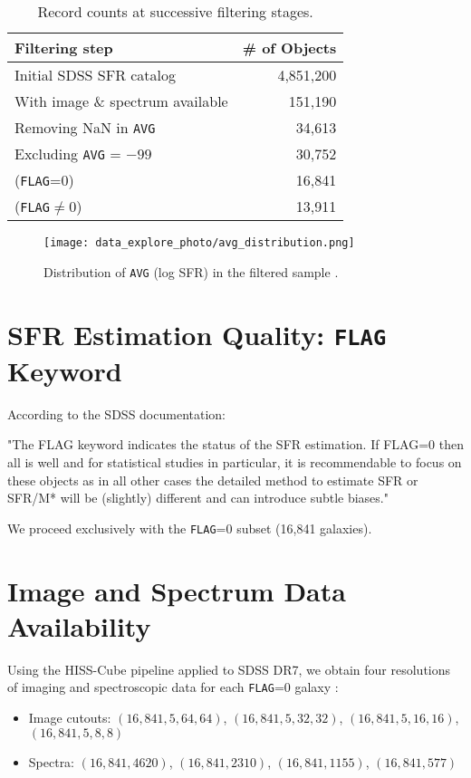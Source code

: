 \documentclass[english,bachelor,oneside]{ctufit-thesis}
\begin{document}
\begin{table}[H]
  \centering
  \caption{Record counts at successive filtering stages.}
  \label{tab:record_counts}
  \begin{tabular}{@{}lr@{}}
    \toprule
    Filtering step & \# of Objects \\
    \midrule
    Initial SDSS SFR catalog & 4,851,200 \\
    With image \& spectrum available & 151,190 \\
    Removing NaN in \texttt{AVG} & 34,613 \\
    Excluding \texttt{AVG} = $-99$ & 30,752 \\
    \quad (\texttt{FLAG}=0) & 16,841 \\
    \quad (\texttt{FLAG}$\neq$0) & 13,911 \\
    \bottomrule
  \end{tabular}
\end{table}

\begin{figure}[H]
    \centering
    \texttt{[image: data\_explore\_photo/avg\_distribution.png]}
    \caption{Distribution of \texttt{AVG} (log SFR) in the filtered sample \cite{data_exploring}.}
    \label{fig:avg_distribution}
\end{figure}

\section{SFR Estimation Quality: \texttt{FLAG} Keyword}
According to the SDSS documentation:

\begin{displayquote}
"The FLAG keyword indicates the status of the SFR estimation. If FLAG=0 then all is well \cite{SDSS_SFR_DOC} and for statistical studies in particular, it is recommendable to focus on these objects as in all other cases the detailed method to estimate SFR or SFR/M* will be (slightly) different and can introduce subtle biases."
\end{displayquote}

We proceed exclusively with the \texttt{FLAG}=0 subset (16,841 galaxies).

\section{Image and Spectrum Data Availability}
Using the HISS-Cube \cite{nadvornik2024hdf5} pipeline applied to SDSS DR7, we obtain four resolutions of imaging and spectroscopic data for each \texttt{FLAG}=0 galaxy \cite{data_exploring} :
\begin{itemize}
  \item Image cutouts: $(16{,}841,5,64,64)$, $(16{,}841,5,32,32)$, $(16{,}841,5,16,16)$, $(16{,}841,5,8,8)$
  \item Spectra: $(16{,}841,4620)$, $(16{,}841,2310)$, $(16{,}841,1155)$, $(16{,}841,577)$
\end{itemize}
\end{document}
